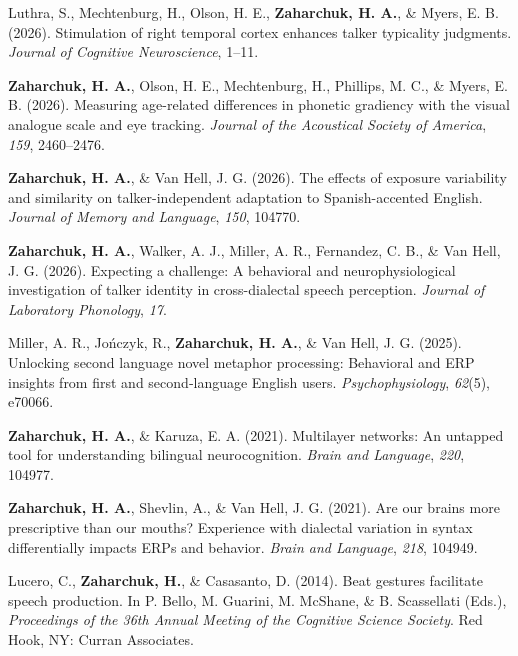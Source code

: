 \documentclass[11pt,a4paper,]{awesome-cv}
\newlength{\cslhangindent}
\newenvironment{CSLReferences}[2] %
 {\begin{list}{}{%
  \setlength{\itemindent}{0pt}
  \setlength{\leftmargin}{0pt}
  \setlength{\parsep}{0pt}
  \ifodd #1
   \setlength{\leftmargin}{\cslhangindent}
   \setlength{\itemindent}{-1\cslhangindent}
  \fi
  \setlength{\itemsep}{#2\baselineskip}}}
 {\end{list}}
\begin{document}
\label{refs-4feb4aa06c91195a4ba66ba2d10e899d}
\begin{CSLReferences}{1}{0}
Luthra, S., Mechtenburg, H., Olson, H. E., \textbf{\textbf{Zaharchuk, H.} A.}, \& Myers,
E. B. (2026). Stimulation of right temporal cortex enhances talker
typicality judgments. \emph{Journal of Cognitive Neuroscience}, 1--11.

\textbf{\textbf{Zaharchuk, H.} A.}, Olson, H. E., Mechtenburg, H., Phillips, M. C., \&
Myers, E. B. (2026). Measuring age-related differences in phonetic
gradiency with the visual analogue scale and eye tracking. \emph{Journal
of the Acoustical Society of America}, \emph{159}, 2460--2476.

\textbf{\textbf{Zaharchuk, H.} A.}, \& Van Hell, J. G. (2026). The effects of exposure
variability and similarity on talker-independent adaptation to
Spanish-accented English. \emph{Journal of Memory and Language},
\emph{150}, 104770.

\textbf{\textbf{Zaharchuk, H.} A.}, Walker, A. J., Miller, A. R., Fernandez, C. B., \& Van
Hell, J. G. (2026). Expecting a challenge: A behavioral and
neurophysiological investigation of talker identity in cross-dialectal
speech perception. \emph{Journal of Laboratory Phonology}, \emph{17}.

Miller, A. R., Jończyk, R., \textbf{\textbf{Zaharchuk, H.} A.}, \& Van Hell, J. G. (2025).
Unlocking second language novel metaphor processing: Behavioral and ERP
insights from first and second‐language English users.
\emph{Psychophysiology}, \emph{62}(5), e70066.

\textbf{\textbf{Zaharchuk, H.} A.}, \& Karuza, E. A. (2021). Multilayer networks: An
untapped tool for understanding bilingual neurocognition. \emph{Brain
and Language}, \emph{220}, 104977.

\textbf{\textbf{Zaharchuk, H.} A.}, Shevlin, A., \& Van Hell, J. G. (2021). Are our brains
more prescriptive than our mouths? Experience with dialectal variation
in syntax differentially impacts ERPs and behavior. \emph{Brain and
Language}, \emph{218}, 104949.

Lucero, C., \textbf{Zaharchuk, H.}, \& Casasanto, D. (2014). Beat gestures
facilitate speech production. In P. Bello, M. Guarini, M. McShane, \& B.
Scassellati (Eds.), \emph{Proceedings of the 36th Annual Meeting of the
Cognitive Science Society}. Red Hook, NY: Curran Associates.

\end{CSLReferences}
\end{document}
